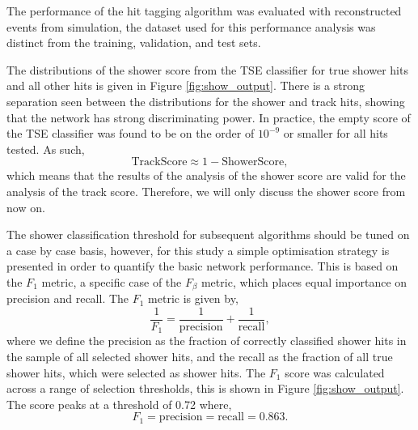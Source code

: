 The performance of the hit tagging algorithm was evaluated with reconstructed
events from \protodune{} simulation, the dataset used for this performance
analysis was distinct from the training, validation, and test sets. 

The distributions of the shower score from the TSE classifier for true shower 
hits and all other hits is given in Figure \ref{fig:show_output}. There is a 
strong separation seen between the distributions for the shower and track 
hits, showing that the network has strong discriminating power. In practice, the
empty score of the TSE classifier was found to be on the order of $10^{-9}$ or
smaller for all hits tested. As such,
\begin{equation*}
	\mbox{TrackScore} \approx 1 - \mbox{ShowerScore},
\end{equation*}
which means that the results of the analysis of the shower score are valid for
the analysis of the track score. Therefore, we will only discuss the shower
score from now on.

The shower classification threshold for subsequent algorithms should be tuned on
a case by case basis, however, for this study a simple optimisation strategy 
is presented in order to quantify the basic network performance. This is based
on the $F_1$ metric, a specific case of the $F_\beta$ 
metric\cite{VanRijsbergenC.J.1975Ir}, which places equal importance on 
precision and recall. The $F_1$ metric is given by, 
\begin{equation*}
	\frac{1}{F_1} = \frac{1}{\mbox{precision}} + \frac{1}{\mbox{recall}},
\end{equation*}
where we define the precision as the fraction of correctly classified shower 
hits in the sample of all selected shower hits, and the recall as the fraction 
of all true shower hits, which were selected as shower hits. The $F_1$ score 
was calculated across a range of selection thresholds, this is shown in Figure 
\ref{fig:show_output}. The score peaks at a threshold of 0.72 where,
\begin{equation*}
	F_1 = \mbox{precision} = \mbox{recall} = 0.863.
\end{equation*}

